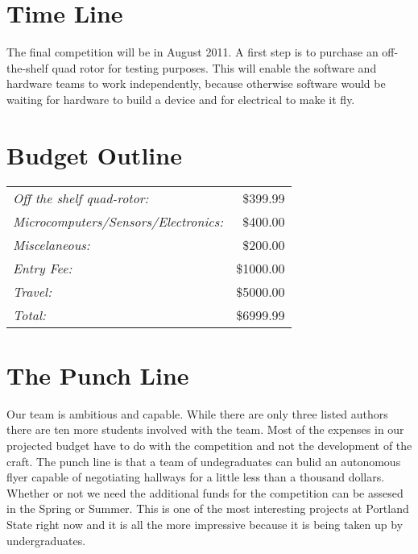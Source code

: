 \documentclass{article}
\begin{document}
\section{Time Line}

The final competition will be in August 2011. A first step is to purchase an off-the-shelf quad rotor for testing purposes. This will enable the software and hardware teams to work independently, because otherwise software would be waiting for hardware to build a device and for electrical to make it fly. 
\section{Budget Outline}

\begin{tabular}[t]{lr}
\it Off the shelf quad-rotor:           &\$399.99\\
\it Microcomputers/Sensors/Electronics: &\$400.00\\
\it Miscelaneous:                       &\$200.00\\
\it Entry Fee:                          &\$1000.00\\
\it Travel:                             &\$5000.00\\\hline
\it Total:                              &\$6999.99\\
\end{tabular}

\section{The Punch Line}

Our team is ambitious and capable. While there are only three listed authors there are ten more students involved with the team. Most of the expenses in our projected budget have to do with the competition and not the development of the craft. The punch line is that a team of undegraduates can bulid an autonomous flyer capable of negotiating hallways for a little less than a thousand dollars. Whether or not we need the additional funds for the competition can be assesed in the Spring or Summer. This is one of the most interesting projects at Portland State right now and it is all the more impressive because it is being taken up by undergraduates. 
\end{document}
